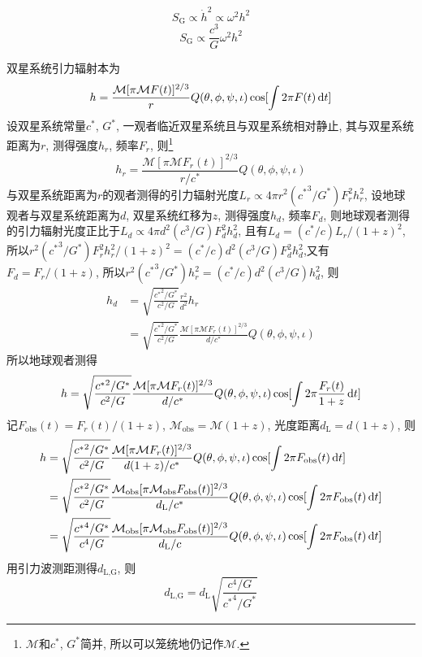 \begin{equation}
    S_\text{G}\propto\dot{h}^2\propto\omega^2 h^2
\end{equation}
\begin{equation}
    S_\text{G}\propto\frac{c^3}{G}\omega^2h^2
\end{equation}

双星系统引力辐射本为
\begin{equation}
    h=\frac{\mathcal{M}[\pi \mathcal{M}F(t)]^{2/3}}{r}Q(\theta,\phi,\psi,\iota)\cos[\int 2\pi F(t)\,\mathrm{d} t]
\end{equation}
设双星系统常量$c^*$, $G^*$, 一观者临近双星系统且与双星系统相对静止, 其与双星系统距离为$r$, 测得强度$h_r$, 频率$F_r$, 则\footnote{$\mathcal{M}$和$c^*$, $G^*$简并, 所以可以笼统地仍记作$\mathcal{M}$.}
\begin{equation}
    h_r=\frac{\mathcal{M}[\pi \mathcal{M}F_r(t)]^{2/3}}{r/c^*}Q(\theta,\phi,\psi,\iota)
\end{equation}
与双星系统距离为$r$的观者测得的引力辐射光度$L_r\propto4\pi r^2({c^*}^3/G^*)F_r^2 h_r^2$, 设地球观者与双星系统距离为$d$, 双星系统红移为$z$, 测得强度$h_d$, 频率$F_d$, 则地球观者测得的引力辐射光度正比于$L_d\propto4\pi d^2(c^3/G)F_d^2 h_d^2$, 且有$L_d=(c^*/c)L_r/(1+z)^2$, 所以$r^2({c^*}^3/G^*)F_r^2 h_r^2/(1+z)^2=(c^*/c)d^2(c^3/G)F_d^2 h_d^2$,又有$F_d=F_r/(1+z)$, 所以$r^2({c^*}^3/G^*)h_r^2=(c^*/c)d^2(c^3/G)h_d^2$, 则
\begin{align}
    h_d&=\sqrt{\frac{{c^*}^2/G^*}{c^2/G}}\frac{r^2}{d^2}h_r\\
    &=\sqrt{\frac{{c^*}^2/G^*}{c^2/G}}\frac{\mathcal{M}[\pi \mathcal{M}F_r(t)]^{2/3}}{d/c^*}Q(\theta,\phi,\psi,\iota)
\end{align}
所以地球观者测得
\begin{equation}
    h=\sqrt{\frac{{c^*}^2/G^*}{c^2/G}}\frac{\mathcal{M}[\pi \mathcal{M}F_r(t)]^{2/3}}{d/c^*}Q(\theta,\phi,\psi,\iota)\cos[\int 2\pi \frac{F_r(t)}{1+z}\,\mathrm{d} t]
\end{equation}
记$F_\text{obs}(t)=F_r(t)/(1+z)$, $\mathcal{M}_\text{obs}=\mathcal{M}(1+z)$, 光度距离$d_\text{L}=d(1+z)$, 则
\begin{align}
    h&=\sqrt{\frac{{c^*}^2/G^*}{c^2/G}}\frac{\mathcal{M}[\pi \mathcal{M}F_r(t)]^{2/3}}{d(1+z)/c^*}Q(\theta,\phi,\psi,\iota)\cos[\int 2\pi F_\text{obs}(t)\,\mathrm{d} t]\\
    &=\sqrt{\frac{{c^*}^2/G^*}{c^2/G}}\frac{\mathcal{M}_\text{obs}[\pi \mathcal{M}_\text{obs}F_\text{obs}(t)]^{2/3}}{d_\text{L}/c^*}Q(\theta,\phi,\psi,\iota)\cos[\int 2\pi F_\text{obs}(t)\,\mathrm{d} t]\\
    &=\sqrt{\frac{{c^*}^4/G^*}{c^4/G}}\frac{\mathcal{M}_\text{obs}[\pi \mathcal{M}_\text{obs}F_\text{obs}(t)]^{2/3}}{d_\text{L}/c}Q(\theta,\phi,\psi,\iota)\cos[\int 2\pi F_\text{obs}(t)\,\mathrm{d} t]
\end{align}
用引力波测距测得$d_\text{L,G}$, 则
\begin{equation}
    d_\text{L,G}=d_\text{L}\sqrt{\frac{c^4/G}{{c^*}^4/G^*}}
\end{equation}

